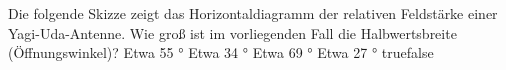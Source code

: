     {Die folgende Skizze zeigt das Horizontaldiagramm der relativen Feldstärke einer Yagi-Uda-Antenne. Wie groß ist im vorliegenden Fall die Halbwertsbreite (Öffnungswinkel)?}
    {Etwa 55 °}
    {Etwa 34 °}
    {Etwa 69 °}
    {Etwa 27 °}
    {true}{false}